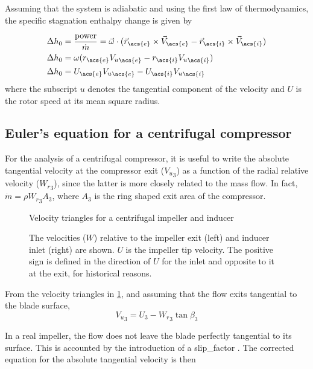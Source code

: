 Assuming that the system is adiabatic and using the first law of thermodynamics, the specific stagnation enthalpy change is given by

\begin{align}
    \Delta h_0 &= \frac{\text{power}}{\dot{m}} 
             = \vec{\omega} \cdot (\vec{r}_{\acs{e}}\cross\vec{V}_{\acs{e}} - \vec{r}_{\acs{i}}\cross\vec{V}_{\acs{i}}) \\
    \Delta h_0 &= \omega (r_{\acs{e}} {V_u}_{\acs{e}} - r_{\acs{i}} {V_u}_{\acs{i}}) \\
    \Delta h_0 &= U_{\acs{e}} {V_u}_{\acs{e}} - U_{\acs{i}} {V_u}_{\acs{i}} 
    \label{eqn:euler}
\end{align}
where the subscript $u$ denotes the tangential component of the velocity and $U$ is the rotor speed at its mean square radius.

\subsection{Euler's equation for a centrifugal compressor}

For the analysis of a centrifugal compressor, 
it is useful to write the absolute tangential velocity at the compressor exit (${V_u}_3$)
as a function of the radial relative velocity (${W_r}_3$),
since the latter is more closely related to the mass flow. 
In fact, $\dot{m} = \rho {W_r}_3 A_3$, where $A_3$ is the ring shaped exit area of the compressor.

\begin{figure}[bp]
    \caption{Velocity triangles for a centrifugal impeller and inducer}
    \label{fig:compressor_schematic}
    
    \source{\authorsfigure}
    \caption*{The velocities ($W$) relative to the impeller exit (left) and inducer inlet (right) are shown. $U$ is the impeller tip velocity. The positive sign is defined in the direction of $U$ for the inlet and opposite to it at the exit, for historical reasons.}
\end{figure}

From the velocity triangles in \cref{fig:compressor_schematic}, 
and assuming that the flow exits tangential to the blade surface,
\begin{equation}
    \label{eqn:V_u_3}
    {V_u}_3 = U_3 - {W_r}_3 \tan\beta_3
\end{equation}

In a real impeller, the flow does not leave the blade perfectly tangential to its surface. 
This is accounted by the introduction of a \acf{slip_factor} \cite{Wiesner1967,Aungier1995}.
The corrected equation for the absolute tangential velocity is then

